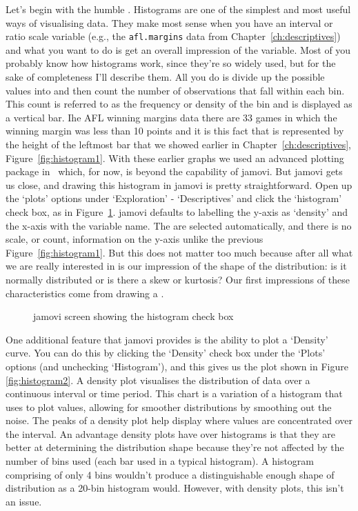 Let's begin with the humble . Histograms are one of the simplest and most useful ways of visualising data. They make most sense when you have an interval or ratio scale variable (e.g., the \texttt{afl.margins} data from Chapter~\ref{ch:descriptives}) and what you want to do is get an overall impression of the variable. Most of you probably know how histograms work, since they're so widely used, but for the sake of completeness I'll describe them. All you do is divide up the possible values into  and then count the number of observations that fall within each bin. This count is referred to as the frequency or density of the bin and is displayed as a vertical bar. Ihe AFL winning margins data there are 33 games in which the winning margin was less than 10 points and it is this fact that is represented by the height of the leftmost bar that we showed earlier in Chapter~\ref{ch:descriptives}, Figure~\ref{fig:histogram1}. With these earlier graphs we used an advanced plotting package in \R\ which, for now, is beyond the capability of jamovi. But jamovi gets us close, and drawing this histogram in jamovi is pretty straightforward. Open up the `plots' options under `Exploration' - `Descriptives' and click the `histogram' check box, as in Figure~\ref{fig:jamovi_histogram}. jamovi defaults to labelling the y-axis as `density' and the x-axis with the variable name. The  are selected automatically, and there is no scale, or count, information on the y-axis unlike the previous Figure~\ref{fig:histogram1}. But this does not matter too much because after all what we are really interested in is our impression of the shape of the distribution: is it normally distributed or is there a skew or kurtosis? Our first impressions of these characteristics come from drawing a .

\begin{figure}[htb]
\begin{center}
\caption{jamovi screen showing the histogram check box}
\label{fig:jamovi_histogram}
\end{center}
\end{figure}

One additional feature that jamovi provides is the ability to plot a `Density' curve. You can do this by clicking the `Density' check box under the `Plots' options (and unchecking `Histogram'), and this gives us the plot shown in Figure \ref{fig:histogram2}. A density plot visualises the distribution of data over a continuous interval or time period. This chart is a variation of a histogram that uses  to plot values, allowing for smoother distributions by smoothing out the noise. The peaks of a density plot help display where values are concentrated over the interval. An advantage density plots have over histograms is that they are better at determining the distribution shape because they're not affected by the number of bins used (each bar used in a typical histogram). A histogram comprising of only 4 bins wouldn't produce a distinguishable enough shape of distribution as a 20-bin histogram would. However, with density plots, this isn't an issue. 

